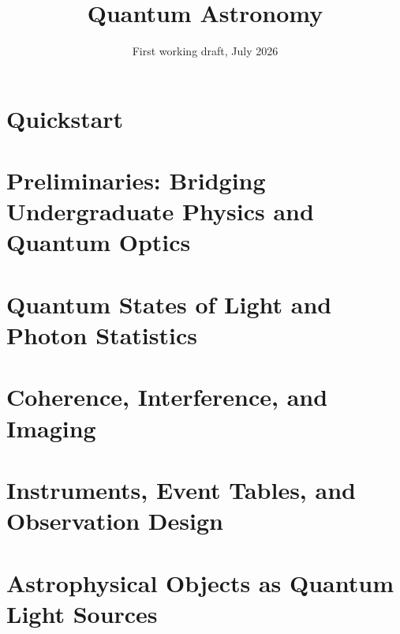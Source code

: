 \documentclass[11pt,openany]{book}
\title{Quantum Astronomy}
\author{\bookauthorblock}
\date{First working draft, July 2026}
\begin{document}
\frontmatter
\qaModernCenteredLayout
\makebookimagecover
{}
\tableofcontents



\cleardoublepage
\qaModernBodyLayout
\mainmatter
\cleardoublepage
\part*{Quickstart}


\part{Preliminaries: Bridging Undergraduate Physics and Quantum Optics}







\part{Quantum States of Light and Photon Statistics}




\part{Coherence, Interference, and Imaging}





\part{Instruments, Event Tables, and Observation Design}




\part{Astrophysical Objects as Quantum Light Sources}





\end{document}
